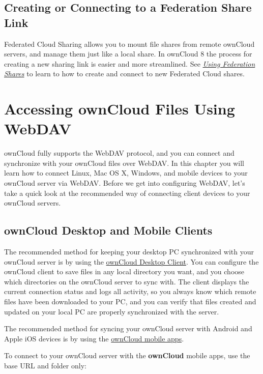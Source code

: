 \documentclass[letterpaper,10pt,english]{sphinxmanual}
\begin{document}
\subsection{Creating or Connecting to a Federation Share Link}
\label{files/access_webgui:creating-or-connecting-to-a-federation-share-link}
Federated Cloud Sharing allows you to mount file shares from remote ownCloud
servers, and manage them just like a local share. In ownCloud 8 the process for
creating a new sharing link is easier and more streamlined. See
{\hyperref[files/federated_cloud_sharing::doc]{\emph{Using Federation Shares}}} to learn to how to create and connect to new
Federated Cloud shares.


\section{Accessing ownCloud Files Using WebDAV}
\label{files/access_webdav:accessing-owncloud-files-using-webdav}\label{files/access_webdav::doc}
ownCloud fully supports the WebDAV protocol, and you can connect and synchronize
with your ownCloud files over WebDAV.  In this chapter you will learn how to
connect Linux, Mac OS X, Windows, and mobile devices to your ownCloud server via
WebDAV. Before we get into configuring WebDAV, let's take a quick look at the
recommended way of connecting client devices to your ownCloud servers.


\subsection{ownCloud Desktop and Mobile Clients}
\label{files/access_webdav:owncloud-desktop-and-mobile-clients}
The recommended method for keeping your desktop PC synchronized with your
ownCloud server is by using the \href{https://owncloud.org/install/\#install-clients}{ownCloud Desktop Client}. You can configure the ownCloud client
to save files in any local directory you want, and you choose which directories
on the ownCloud server to sync with. The client displays the current connection
status and logs all activity, so you always know which remote files have been
downloaded to your PC, and you can verify that files created and updated on your
local PC are properly synchronized with the server.

The recommended method for syncing your ownCloud server with Android and
Apple iOS devices is by using the \href{https://owncloud.org/install/\#install-clients}{ownCloud mobile apps}.

To connect to your ownCloud server with the \textbf{ownCloud} mobile apps, use the
base URL and folder only:
\end{document}
